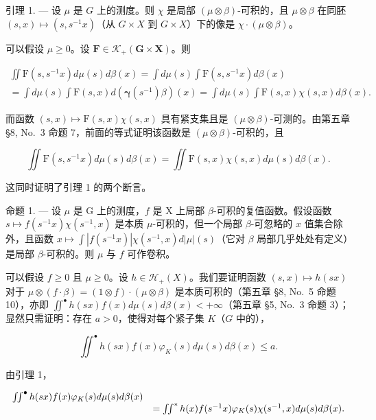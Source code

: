 引理 1. --- 设 \(\mu\) 是 \(G\) 上的测度。则 \(\chi\) 是局部 \((\mu \otimes \beta)\)-可积的，且 \(\mu \otimes \beta\) 在同胚 \((s, x) \mapsto (s, s^{-1}x)\)（从 \(G \times X\) 到 \(G \times X\)）下的像是 \(\chi \cdot (\mu \otimes \beta)\)。

可以假设 \(\mu \geqslant 0\)。设 \(\mathbf{F} \in \mathcal{K}_{+}(\mathbf{G} \times \mathbf{X})\)。则

\[
\begin{array}{l} \iint \mathrm{F} (s, s ^ {- 1} x) d \mu (s) d \beta (x) = \int d \mu (s) \int \mathrm{F} (s, s ^ {- 1} x) d \beta (x) \\ = \int d \mu (s) \int \mathrm{F} (s, x) d (\boldsymbol {\gamma} (s ^ {- 1}) \beta) (x) = \int d \mu (s) \int \mathrm{F} (s, x) \chi (s, x) d \beta (x). \end{array}
\]

而函数 \((s,x)\mapsto\mathrm{F}(s,x)\chi(s,x)\) 具有紧支集且是 \((\mu\otimes\beta)\)-可测的。由第五章 §8, No.~3 命题 7，前面的等式证明该函数是 \((\mu\otimes\beta)\)-可积的，且

\[
\iint \mathrm{F} (s, s ^ {- 1} x) d \mu (s) d \beta (x) = \iint \mathrm{F} (s, x) \chi (s, x) d \mu (s) d \beta (x).
\]

这同时证明了引理 1 的两个断言。

命题 1. --- 设 \(\mu\) 是 G 上的测度，\(f\) 是 X 上局部 \(\beta\)-可积的复值函数。假设函数 \(s \mapsto f(s^{-1}x)\chi(s^{-1}, x)\) 是本质 \(\mu\)-可积的，但一个局部 \(\beta\)-可忽略的 \(x\) 值集合除外，且函数 \(x \mapsto \int |f(s^{-1}x)| \chi(s^{-1}, x) d|\mu|(s)\)（它对 \(\beta\) 局部几乎处处有定义）是局部 \(\beta\)-可积的。则 \(\mu\) 与 \(f\) 可作卷积。

可以假设 \(f \geqslant 0\) 且 \(\mu \geqslant 0\)。设 \(h \in \mathcal{H}_{+}(X)\)。我们要证明函数 \((s, x) \mapsto h(sx)\) 对于 \(\mu \otimes (f \cdot \beta) = (1 \otimes f) \cdot (\mu \otimes \beta)\) 是本质可积的（第五章 §8, No.~5 命题 10），亦即 \(\iint^{\bullet} h(sx)f(x)d\mu(s)d\beta(x) < +\infty\)（第五章 §5, No.~3 命题 3）；显然只需证明：存在 \(a > 0\)，使得对每个紧子集 \(K\)（\(G\) 中的），

\[
\iint^ {\bullet} h (s x) f (x) \varphi_ {K} (s) d \mu (s) d \beta (x) \leqslant a.
\]

由引理 1，

\[
\begin{array}{r l} \iint^ {\bullet} h (s x) f (x) \varphi_ {K} (s) d \mu (s) d \beta (x) \\ & = \iint^ {*} h (x) f (s ^ {- 1} x) \varphi_ {K} (s) \chi (s ^ {- 1}, x) d \mu (s) d \beta (x). \end{array}
\]

